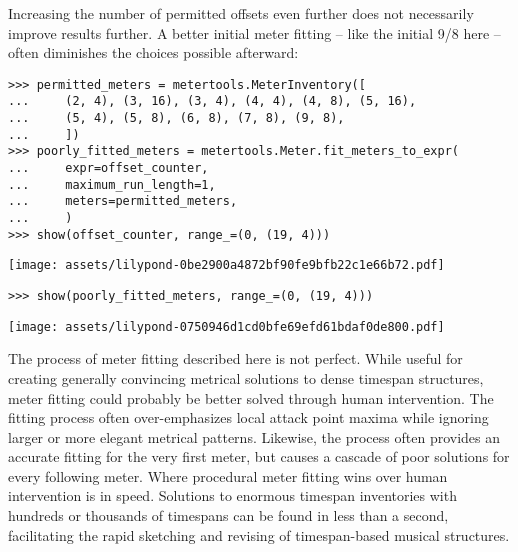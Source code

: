 \noindent Increasing the number of permitted offsets even further does not
necessarily improve results further. A better initial meter fitting -- like the
initial 9/8 here -- often diminishes the choices possible afterward:

\begin{comment}
<abjad>
permitted_meters = metertools.MeterInventory([
    (2, 4), (3, 16), (3, 4), (4, 4), (4, 8), (5, 16),
    (5, 4), (5, 8), (6, 8), (7, 8), (9, 8),
    ])
poorly_fitted_meters = metertools.Meter.fit_meters_to_expr(
    expr=offset_counter,
    maximum_run_length=1,
    meters=permitted_meters,
    )
show(offset_counter, range_=(0, (19, 4)))
show(poorly_fitted_meters, range_=(0, (19, 4)))
</abjad>
\end{comment}

\begin{abjadbookoutput}
\begin{singlespacing}
\vspace{-0.5\baselineskip}
\begin{verbatim}
>>> permitted_meters = metertools.MeterInventory([
...     (2, 4), (3, 16), (3, 4), (4, 4), (4, 8), (5, 16),
...     (5, 4), (5, 8), (6, 8), (7, 8), (9, 8),
...     ])
>>> poorly_fitted_meters = metertools.Meter.fit_meters_to_expr(
...     expr=offset_counter,
...     maximum_run_length=1,
...     meters=permitted_meters,
...     )
>>> show(offset_counter, range_=(0, (19, 4)))
\end{verbatim}
\noindent\texttt{[image: assets/lilypond-0be2900a4872bf90fe9bfb22c1e66b72.pdf]}
\begin{verbatim}
>>> show(poorly_fitted_meters, range_=(0, (19, 4)))
\end{verbatim}
\noindent\texttt{[image: assets/lilypond-0750946d1cd0bfe69efd61bdaf0de800.pdf]}
\end{singlespacing}
\end{abjadbookoutput}

\noindent The process of meter fitting described here is not perfect. While
useful for creating generally convincing metrical solutions to dense timespan
structures, meter fitting could probably be better solved through human
intervention. The fitting process often over-emphasizes local attack point
maxima while ignoring larger or more elegant metrical patterns. Likewise, the
process often provides an accurate fitting for the very first meter, but causes
a cascade of poor solutions for every following meter. Where procedural meter
fitting wins over human intervention is in speed. Solutions to enormous
timespan inventories with hundreds or thousands of timespans can be found in
less than a second, facilitating the rapid sketching and revising of
timespan-based musical structures.

